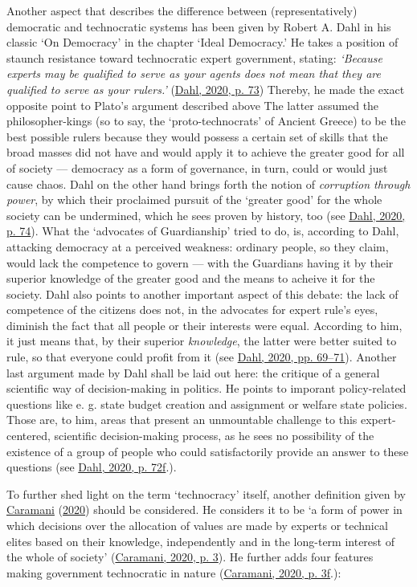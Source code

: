\documentclass[
  12pt,
  english,
]{article}
\begin{document}
Another aspect that describes the difference between (representatively)
democratic and technocratic systems has been given by Robert A. Dahl in
his classic `On Democracy' in the chapter `Ideal Democracy.' He takes a
position of staunch resistance toward technocratic expert government,
stating: \emph{`Because experts may be qualified to serve as your agents
does not mean that they are qualified to serve as your rulers.'}
(\protect\hyperlink{ref-dahl_onDemocracy}{Dahl, 2020, p. 73}) Thereby,
he made the exact opposite point to Plato's argument described above The
latter assumed the philosopher-kings (so to say, the `proto-technocrats'
of Ancient Greece) to be the best possible rulers because they would
possess a certain set of skills that the broad masses did not have and
would apply it to achieve the greater good for all of society ---
democracy as a form of governance, in turn, could or would just cause
chaos. Dahl on the other hand brings forth the notion of
\emph{corruption through power}, by which their proclaimed pursuit of
the `greater good' for the whole society can be undermined, which he
sees proven by history, too (see
\protect\hyperlink{ref-dahl_onDemocracy}{Dahl, 2020, p. 74}). What the
`advocates of Guardianship' tried to do, is, according to Dahl,
attacking democracy at a perceived weakness: ordinary people, so they
claim, would lack the competence to govern --- with the Guardians having
it by their superior knowledge of the greater good and the means to
acheive it for the society. Dahl also points to another important aspect
of this debate: the lack of competence of the citizens does not, in the
advocates for expert rule's eyes, diminish the fact that all people or
their interests were equal. According to him, it just means that, by
their superior \emph{knowledge}, the latter were better suited to rule,
so that everyone could profit from it (see
\protect\hyperlink{ref-dahl_onDemocracy}{Dahl, 2020, pp. 69--71}).
Another last argument made by Dahl shall be laid out here: the critique
of a general scientific way of decision-making in politics. He points to
imporant policy-related questions like e. g. state budget creation and
assignment or welfare state policies. Those are, to him, areas that
present an unmountable challenge to this expert-centered, scientific
decision-making process, as he sees no possibility of the existence of a
group of people who could satisfactorily provide an answer to these
questions (see \protect\hyperlink{ref-dahl_onDemocracy}{Dahl, 2020, p.
72f}.).

To further shed light on the term `technocracy' itself, another
definition given by
\protect\hyperlink{ref-caramani2020technocratic}{Caramani}
(\protect\hyperlink{ref-caramani2020technocratic}{2020}) should be
considered. He considers it to be `a form of power in which decisions
over the allocation of values are made by experts or technical elites
based on their knowledge, independently and in the long-term interest of
the whole of society'
(\protect\hyperlink{ref-caramani2020technocratic}{Caramani, 2020, p.
3}). He further adds four features making government technocratic in
nature (\protect\hyperlink{ref-caramani2020technocratic}{Caramani, 2020,
p. 3f}.):
\end{document}
